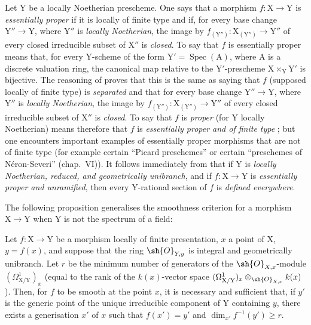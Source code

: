 \begin{remark}[18.10.20]
\label{IV.18.10.20}
Let $\mathrm{Y}$ be a locally Noetherian prescheme.
One says that a morphism $f:\mathrm{X}\to\mathrm{Y}$ is \emph{essentially proper} if it is locally of finite type and if, for every base change $\mathrm{Y}''\to\mathrm{Y}$, where $\mathrm{Y}''$ is \emph{locally Noetherian}, the image by $f_{(\mathrm{Y}'')}:\mathrm{X}_{(\mathrm{Y}'')}\to\mathrm{Y}''$ of every closed irreducible subset of $\mathrm{X}''$ is \emph{closed}.
To say that $f$ is essentially proper means that, for every $\mathrm{Y}$-scheme of the form $\mathrm{Y}'=\operatorname{Spec}(\mathrm{A})$, where $\mathrm{A}$ is a discrete valuation ring, the canonical map  relative to the $\mathrm{Y}'$-prescheme $\mathrm{X}\times_{\mathrm{Y}}\mathrm{Y}'$ is bijective.
The reasoning of  proves that this is the same as saying that $f$ (supposed locally of finite type) is \emph{separated} and that for every base change $\mathrm{Y}''\to\mathrm{Y}$, where $\mathrm{Y}''$ is \emph{locally Noetherian}, the image by $f_{(\mathrm{Y}'')}: \mathrm{X}_{(\mathrm{Y}'')}\to\mathrm{Y}''$ of every closed irreducible subset of $\mathrm{X}''$ is \emph{closed}.
To say that $f$ is \emph{proper} (for $\mathrm{Y}$ locally Noetherian) means therefore that $f$ is \emph{essentially proper and of finite type} ; but one encounters important examples of essentially proper morphisms that are not of finite type (for example certain ``Picard preschemes'' or certain ``preschemes of N\'eron-Severi'' (chap.~VI)).
It follows immediately from  that if $\mathrm{Y}$ is \emph{locally Noetherian, reduced, and geometrically unibranch}, and if $f:\mathrm{X}\to\mathrm{Y}$ is \emph{essentially proper and unramified}, then every $\mathrm{Y}$-rational section of $f$ is \emph{defined everywhere}.
\end{remark}

The following proposition generalises the smoothness criterion  for a morphism $\mathrm{X}\to\mathrm{Y}$ when $\mathrm{Y}$ is not the spectrum of a field:

\begin{proposition}[18.10.21]
\label{IV.18.10.21}
Let $f:\mathrm{X}\to\mathrm{Y}$ be a morphism locally of finite presentation, $x$ a point of $\mathrm{X}$, $y=f(x)$, and suppose that the ring $\sh{O}_{Y,y}$ is integral and geometrically unibranch.
Let $r$ be the minimum number of generators of the $\sh{O}_{X,x}$-module $(\Omega^1_{\mathrm{X}/\mathrm{Y}})_x$ (equal to the rank of the $k(x)$-vector space $(\Omega^1_{\mathrm{X}/\mathrm{Y}})_x\otimes_{\sh{O}_{X,x}}k(x)$).
Then, for $f$ to be smooth at the point $x$, it is necessary and sufficient that, if $y'$ is the generic point of the unique irreducible component of $\mathrm{Y}$ containing $y$, there exists a generisation $x'$ of $x$ such that $f(x')=y'$ and $\dim_{x'}f^{-1}(y')\geq r$.
\end{proposition}

